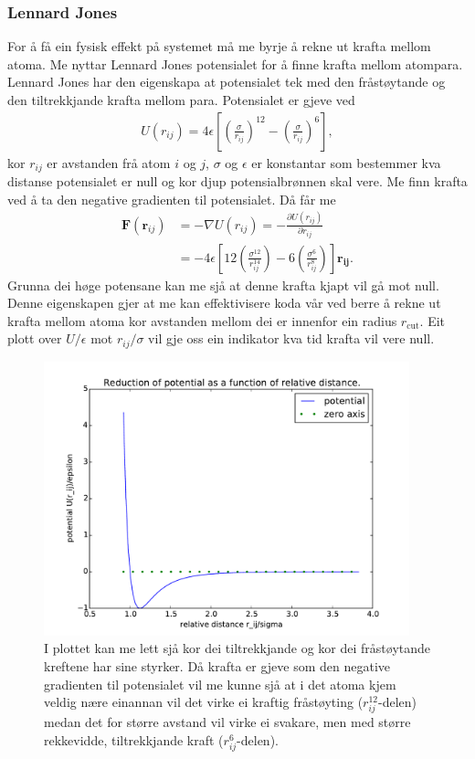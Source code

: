 \documentclass[12pt, a4paper]{article}
\theoremstyle{definition} \newtheorem*{definition}{Teorem}
\newcommand{\vb}{\mathbf}
\begin{document}
        \subsubsection*{Lennard Jones}
            For å få ein fysisk effekt på systemet må me byrje å rekne ut krafta mellom atoma. Me nyttar Lennard Jones potensialet for å finne krafta mellom atompara.
            Lennard Jones har den eigenskapa at potensialet tek med den fråstøytande og den tiltrekkjande krafta mellom para. Potensialet er gjeve ved
            \begin{align*}
                U(r_{ij}) = 4\epsilon\left[ \left( \frac{\sigma}{r_{ij}} \right)^{12} - \left( \frac{\sigma}{r_{ij}} \right)^{6} \right],
            \end{align*}
            kor $r_{ij}$ er avstanden frå atom $i$ og $j$, $\sigma$ og $\epsilon$ er konstantar som bestemmer kva distanse potensialet er null og kor djup potensialbrønnen skal vere.
            Me finn krafta ved å ta den negative gradienten til potensialet. Då får me
            \begin{align*}
                \vb{F}(\vb{r}_{ij}) &= -\nabla U(r_{ij}) = -\frac{\partial U(r_{ij})}{\partial r_{ij}} \\
                &= -4\epsilon\left[ 12\left( \frac{\sigma^{12}}{r_{ij}^{14}} \right) - 6\left( \frac{\sigma^6}{r_{ij}^8} \right) \right]\vb{r_{ij}}.
            \end{align*}
            Grunna dei høge potensane kan me sjå at denne krafta kjapt vil gå mot null. Denne eigenskapen gjer at me kan effektivisere koda vår ved berre å rekne ut krafta 
            mellom atoma kor avstanden mellom dei er innenfor ein radius $r_{\text{cut}}$.
            Eit plott over $U/\epsilon$ mot $r_{ij}/\sigma$ vil gje oss ein indikator kva tid krafta vil vere null.
            \begin{figure}[H]
                \centering
                \includegraphics[width=400px]{potentialPlot.pdf}
                \caption{I plottet kan me lett sjå kor dei tiltrekkjande og kor dei fråstøytande kreftene har sine styrker. Då krafta er gjeve som den negative gradienten til
                        potensialet vil me kunne sjå at i det atoma kjem veldig nære einannan vil det virke ei kraftig fråstøyting ($r_{ij}^{12}$-delen) medan det for større avstand
                        vil virke ei svakare, men med større rekkevidde, tiltrekkjande kraft ($r_{ij}^6$-delen).}
            \end{figure}
\end{document}
